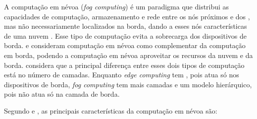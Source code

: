 A computação em névoa (\emph{fog computing}) é um paradigma que distribui
as capacidades de computação, armazenamento e rede entre os nós próximos
e dos , mas não necessariamente localizados na borda,
dando a esses nós características de uma nuvem
\cite{Bonomi2012,Dastjerdi2016,IEEECommunicationsSociety2018}.
Esse tipo de computação evita a sobrecarga dos dispositivos de borda.
 e
 consideram computação em névoa como complementar da
computação em borda, podendo a computação em névoa aproveitar os recursos da
nuvem e da borda.
 considera que a
principal diferença entre esses dois tipos de computação está no número de
camadas.
Enquanto \emph{edge computing} tem
, pois atua só nos
dispositivos de borda, \emph{fog computing} tem mais camadas e um modelo
hierárquico, pois não atua só na camada de borda.

Segundo  e , as principais
características da computação em névoa são:

